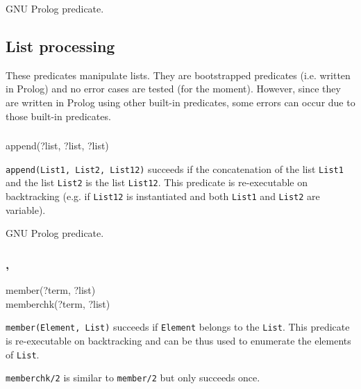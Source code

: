 \Portability

GNU Prolog predicate.

\subsection{List processing}

These predicates manipulate lists. They are bootstrapped predicates (i.e.
written in Prolog) and no error cases are tested (for the moment). However,
since they are written in Prolog using other built-in predicates, some
errors can occur due to those built-in predicates.

\subsubsection{}

\begin{TemplatesOneCol}
append(?list, ?list, ?list)

\end{TemplatesOneCol}

\Description

\texttt{append(List1, List2, List12)} succeeds if the concatenation of the
list \texttt{List1} and the list \texttt{List2} is the list \texttt{List12}.
This predicate is re-executable on backtracking (e.g. if \texttt{List12} is
instantiated and both \texttt{List1} and \texttt{List2} are variable).

\PlErrorsNone

\Portability

GNU Prolog predicate.

\subsubsection{, \label{member/2}
               }

\begin{TemplatesOneCol}
member(?term, ?list)\\
memberchk(?term, ?list)

\end{TemplatesOneCol}

\Description

\texttt{member(Element, List)} succeeds if \texttt{Element} belongs to the
\texttt{List}. This predicate is re-executable on backtracking and can be
thus used to enumerate the elements of \texttt{List}.

\texttt{memberchk/2} is similar to \texttt{member/2} but only succeeds once.

